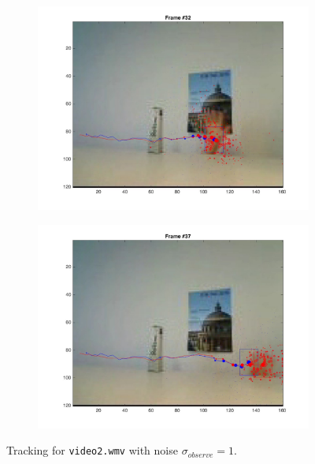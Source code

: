\documentclass{ethz_report}
\begin{document}
\begin{figure}[h]
\begin{subfigure}[b]{.25\textwidth}
        \includegraphics[width=1\linewidth]{images/video2_observe_high_31}
    \end{subfigure}%
    \begin{subfigure}[b]{.25\textwidth}
        \centering
        \includegraphics[width=1\linewidth]{images/video2_observe_high_36}
    \end{subfigure}
    \caption{Tracking for \texttt{video2.wmv} with noise $\sigma_{observe} = 1$.}
    \label{fig:tracking_video2_observe_high}
\end{figure}
\end{document}
